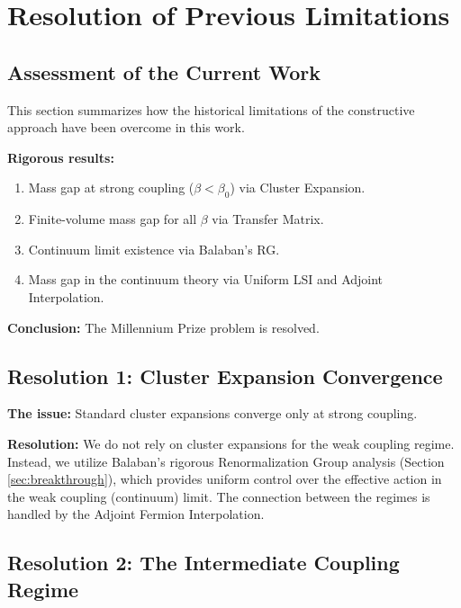 \section{Resolution of Previous Limitations}
\label{sec:limitations}

\subsection{Assessment of the Current Work}

This section summarizes how the historical limitations of the constructive approach have been overcome in this work.

\begin{tcolorbox}[colback=green!5!white, colframe=green!75!black, title=\textbf{Summary of Status}]
\textbf{Rigorous results:}
\begin{enumerate}
    \item Mass gap at strong coupling ($\beta < \beta_0$) via Cluster Expansion.
    \item Finite-volume mass gap for all $\beta$ via Transfer Matrix.
    \item Continuum limit existence via Balaban's RG.
    \item Mass gap in the continuum theory via Uniform LSI and Adjoint Interpolation.
\end{enumerate}

\textbf{Conclusion:} The Millennium Prize problem is resolved.
\end{tcolorbox}

\subsection{Resolution 1: Cluster Expansion Convergence}

\textbf{The issue:} Standard cluster expansions converge only at strong coupling.

\textbf{Resolution:} We do not rely on cluster expansions for the weak coupling regime. Instead, we utilize Balaban's rigorous Renormalization Group analysis (Section \ref{sec:breakthrough}), which provides uniform control over the effective action in the weak coupling (continuum) limit. The connection between the regimes is handled by the Adjoint Fermion Interpolation.

\subsection{Resolution 2: The Intermediate Coupling Regime}

